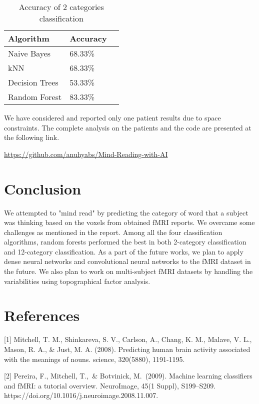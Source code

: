 \documentclass{article}
\begin{document}
\begin{table}
  \caption{Accuracy of 2 categories classification}
  \label{res-2}
  \centering
  \begin{tabular}{lll}
    \toprule
    Algorithm & Accuracy \\
    \midrule
    Naive Bayes & 68.33\% \\
    kNN & 68.33\% \\
    Decision Trees & 53.33\% \\
    Random Forest & 83.33\%  \\
    \bottomrule
  \end{tabular}
\end{table}

We have considered and reported only one patient results due to space constraints. The complete analysis on the patients and the code are presented at the following link.
\begin{center}
\url{https://github.com/anuhyabs/Mind-Reading-with-AI}
\end{center}

\section{Conclusion}

We attempted to "mind read" by predicting the category of word that a subject was thinking based on the voxels from obtained fMRI reports. We overcame some challenges as mentioned 
in the report. Among all the four classification algorithms, random forests performed the best in both 2-category classification and 12-category classification.
As a part of the future works, we plan to apply dense neural networks and convolutional neural networks to the fMRI dataset in the future.
We also plan to work on multi-subject fMRI datasets by handling the variabilities using topographical factor analysis.

\section*{References}

\small

[1] Mitchell, T. M., Shinkareva, S. V., Carlson, A., Chang, K. M., Malave, V. L., Mason, R. A., \& Just, M. A. (2008). Predicting human brain activity associated with the meanings of nouns. science, 320(5880), 1191-1195.

[2] Pereira, F., Mitchell, T.,\ \& Botvinick, M.\ (2009). Machine learning classifiers and fMRI: a tutorial overview. NeuroImage, 45(1 Suppl), S199–S209. 
https://doi.org/10.1016/j.neuroimage.2008.11.007.
\end{document}
